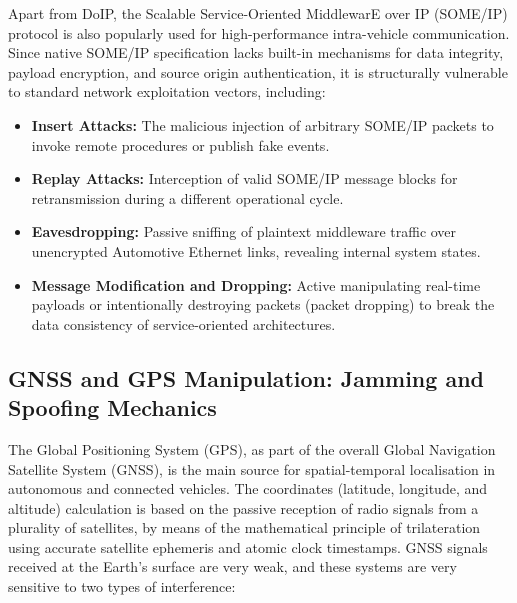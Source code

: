 Apart from \gls{DoIP},  the Scalable Service-Oriented MiddlewarE over IP (\gls{SOME/IP}) protocol is also popularly used for high-performance intra-vehicle communication. Since native \gls{SOME/IP} specification lacks built-in mechanisms for data integrity, payload encryption, and source origin authentication, it is structurally vulnerable to standard network exploitation vectors, including:
\begin{itemize}
    \item \textbf{Insert Attacks:} The malicious injection of arbitrary \gls{SOME/IP} packets to invoke remote procedures or publish fake events.
    \item \textbf{Replay Attacks:} Interception of valid \gls{SOME/IP} message blocks for retransmission during a different operational cycle.
    \item \textbf{Eavesdropping:} Passive sniffing of plaintext middleware traffic over unencrypted Automotive Ethernet links, revealing internal system states.
    \item \textbf{Message Modification and Dropping:} Active manipulating real-time payloads or intentionally destroying packets (packet dropping) to break the data consistency of service-oriented architectures.
\end{itemize}

\subsection{GNSS and GPS Manipulation: Jamming and Spoofing Mechanics}
The Global Positioning System (GPS), as part of the overall Global Navigation Satellite System (\gls{GNSS}), is the main source for spatial-temporal localisation in autonomous and connected vehicles. The coordinates (latitude, longitude, and altitude) calculation is based on the passive reception of radio signals from a plurality of satellites, by means of the mathematical principle of trilateration using accurate satellite ephemeris and atomic clock timestamps. \gls{GNSS} signals received at the Earth’s surface are very weak, and these systems are very sensitive to two types of interference:

